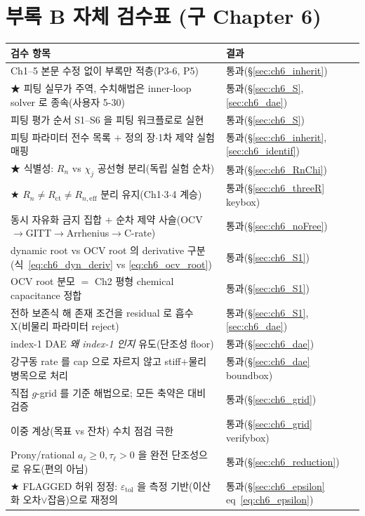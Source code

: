 \documentclass[11pt,a4paper]{article}
\newcommand{\eff}{\mathrm{eff}}
\newcommand{\ct}{\mathrm{ct}}
\newcommand{\tol}{\mathrm{tol}}
\begin{document}
\section{부록 B 자체 검수표 (구 Chapter 6)}\label{sec:ch6_selfcheck}
{\small
\begin{longtable}{p{} p{}}
\toprule 검수 항목 & 결과 \\ \midrule \endhead
Ch1--5 본문 수정 없이 부록만 적층(P3-6, P5) & 통과(\S\ref{sec:ch6_inherit}) \\
★ 피팅 실무가 주역, 수치해법은 inner-loop solver 로 종속(사용자 5-30) & 통과(\S\ref{sec:ch6_S},\ref{sec:ch6_dae}) \\
피팅 평가 순서 S1--S6 을 피팅 워크플로로 실현 & 통과(\S\ref{sec:ch6_S}) \\
피팅 파라미터 전수 목록 $+$ 정의 장$\cdot$1차 제약 실험 매핑 & 통과(\S\ref{sec:ch6_inherit},\ref{sec:ch6_identif}) \\
★ 식별성: $R_n$ vs $\chi_j$ 공선형 분리(독립 실험 순차) & 통과(\S\ref{sec:ch6_RnChi}) \\
★ $R_n\ne R_\ct\ne R_{n,\eff}$ 분리 유지(Ch1$\cdot$3$\cdot$4 계승) & 통과(\S\ref{sec:ch6_threeR} keybox) \\
동시 자유화 금지 집합 $+$ 순차 제약 사슬(OCV$\to$GITT$\to$Arrhenius$\to$C-rate) & 통과(\S\ref{sec:ch6_noFree}) \\
dynamic root vs OCV root 의 derivative 구분(식~\eqref{eq:ch6_dyn_deriv} vs \eqref{eq:ch6_ocv_root}) & 통과(\S\ref{sec:ch6_S1}) \\
OCV root 분모 $=$ Ch2 평형 chemical capacitance 정합 & 통과(\S\ref{sec:ch6_S1}) \\
전하 보존식 해 존재 조건을 residual 로 흡수 X(비물리 파라미터 reject) & 통과(\S\ref{sec:ch6_S1},\ref{sec:ch6_dae}) \\
index-1 DAE \emph{왜 index-1 인지} 유도(단조성 floor) & 통과(\S\ref{sec:ch6_dae}) \\
강구동 rate 를 cap 으로 자르지 않고 stiff$+$물리 병목으로 처리 & 통과(\S\ref{sec:ch6_dae} boundbox) \\
직접 $g$-grid 를 기준 해법으로; 모든 축약은 대비 검증 & 통과(\S\ref{sec:ch6_grid}) \\
이중 계상(목표 vs 잔차) 수치 점검 극한 & 통과(\S\ref{sec:ch6_grid} verifybox) \\
Prony/rational $a_\ell\ge0,\tau_\ell>0$ 을 완전 단조성으로 유도(편의 아님) & 통과(\S\ref{sec:ch6_reduction}) \\
★ FLAGGED 허위 정정: $\varepsilon_\tol$ 을 측정 기반(이산화 오차$\vee$잡음)으로 재정의 & 통과(\S\ref{sec:ch6_epsilon} eq~\eqref{eq:ch6_epsilon}) \\

\end{longtable}}
\end{document}
